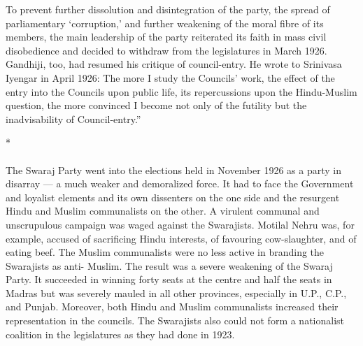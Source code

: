 To prevent further dissolution and disintegration of the party, the spread of parliamentary `corruption,' and further weakening of the moral fibre of its members, the main leadership of the party reiterated its faith in mass civil disobedience and decided to withdraw from the legislatures in March 1926. Gandhiji, too, had resumed his critique of council-entry. He wrote to Srinivasa Iyengar in April 1926: The more I study the Councils' work, the effect of the entry into the Councils upon public life, its repercussions upon the Hindu-Muslim question, the more convinced I become not only of the futility but the inadvisability of Council-entry.''

\begin{center}*\end{center}

\paragraph*{}
The Swaraj Party went into the elections held in November 1926 as a party in disarray — a much weaker and demoralized force. It had to face the Government and loyalist elements and its own dissenters on the one side and the resurgent Hindu and Muslim communalists on the other. A virulent communal and unscrupulous campaign was waged against the Swarajists. Motilal Nehru was, for example, accused of sacrificing Hindu interests, of favouring cow-slaughter, and of eating beef. The Muslim communalists were no less active in branding the Swarajists as anti- Muslim. The result was a severe weakening of the Swaraj Party. It succeeded in winning forty seats at the centre and half the seats in Madras but was severely mauled in all other provinces, especially in U.P., C.P., and Punjab. Moreover, both Hindu and Muslim communalists increased their representation in the councils. The Swarajists also could not form a nationalist coalition in the legislatures as they had done in 1923.

